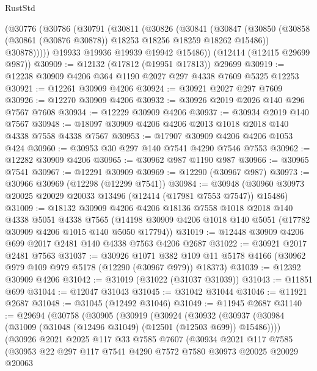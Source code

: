 \begin{lexlean}{RustStd}
\begin{coremodule}
{\begin{coremodule}
{{{{{{{{{{{{{{{{{{{{{{{{{{{{{{{{{{{{{{{{{{{{{{{{{{    (@30776
      (@30786
        (@30791
          (@30811
            (@30826
              (@30841
                (@30847
                  (@30850 (@30858 (@30861 (@30876 @30878)) @18253 @18256 @18259 @18262 @15486))
                  @30878)))))
        @19933
        @19936
        @19939
        @19942
        @15486))
    (@12414 (@12415 @29699 @987))
@30909 := @12132 (@17812 (@19951 @17813)) @29699
@30919 := @12238 @30909 @4206 @364 @1190 @2027 @297 @4338 @7609 @5325 @12253
@30921 := @12261 @30909 @4206
@30924 := @30921 @2027 @297 @7609
@30926 := @12270 @30909 @4206
@30932 := @30926 @2019 @2026 @140 @296 @7567 @7608
@30934 := @12229 @30909 @4206
@30937 := @30934 @2019 @140 @7567
@30948 := @18097 @30909 @4206 @4206 @2013 @1018 @2018 @140 @4338 @7558 @4338 @7567
@30953 := @17907 @30909 @4206 @4206 @1053 @424
@30960 := @30953 @30 @297 @140 @7541 @4290 @7546 @7553
@30962 := @12282 @30909 @4206
@30965 := @30962 @987 @1190 @987
@30966 := @30965 @7541
@30967 := @12291 @30909
@30969 := @12290 (@30967 @987)
@30973 := @30966 @30969 (@12298 (@12299 @7541))
@30984 := @30948 (@30960 @30973 @20025 @20029 @20033 @13496 (@12414 (@17981 @7553 @7547)) @15486)
@31009 := @18132
    @30909
    @4206
    @4206
    @18136
    @7558
    @1018
    @2018
    @140
    @4338
    @5051
    @4338
    @7565
    (@14198 @30909 @4206 @1018 @140 @5051 (@17782 @30909 @4206 @1015 @140 @5050 @17794))
@31019 := @12448 @30909 @4206 @699 @2017 @2481 @140 @4338 @7563 @4206 @2687
@31022 := @30921 @2017 @2481 @7563
@31037 := @30926
    @1071
    @382
    @109
    @11
    @5178
    @4166
    (@30962 @979 @109 @979 @5178 (@12290 (@30967 @979)) @18373)
@31039 := @12392 @30909 @4206
@31042 := @31019 (@31022 (@31037 @31039))
@31043 := @11851 @699
@31044 := @12047 @31043
@31045 := @31042 @31044
@31046 := @11921 @2687
@31048 := @31045 (@12492 @31046)
@31049 := @11945 @2687
@31140 := @29694
    (@30758
      (@30905
        (@30919
          (@30924
            (@30932
              (@30937 (@30984 (@31009 (@31048 (@12496 @31049) (@12501 (@12503 @699)) @15486))))
              (@30926
                @2021
                @2025
                @117
                @33
                @7585
                @7607
                (@30934
                  @2021
                  @117
                  @7585
                  (@30953
                    @22
                    @297
                    @117
                    @7541
                    @4290
                    @7572
                    @7580
                    @30973
                    @20025
                    @20029
                    @20063
}}}}}}}}}}}}}}}}}}}}}}}}}}}}}}}}}}}}}}}}}}}}}}}}}}
\end{coremodule}}
\end{coremodule}
\end{lexlean}
